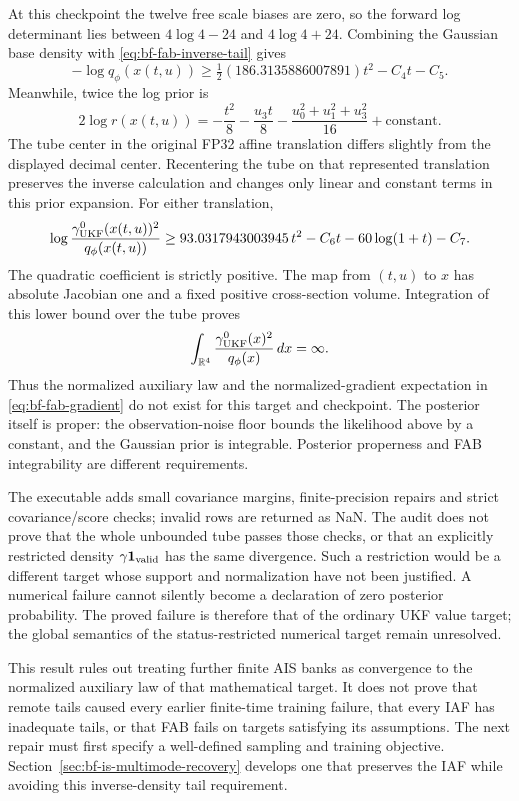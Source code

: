 At this checkpoint the twelve free scale biases are zero, so the forward
log determinant lies between $4\log4-24$ and $4\log4+24$. Combining the
Gaussian base density with \eqref{eq:bf-fab-inverse-tail} gives
\begin{equation}
 -\log q_\phi(x(t,u))\ge
 \tfrac12(186.3135886007891)t^2-C_4t-C_5.
\end{equation}
Meanwhile, twice the log prior is
\begin{equation}
 2\log r(x(t,u))=-\frac{t^2}{8}-\frac{u_3t}{8}
 -\frac{u_0^2+u_1^2+u_3^2}{16}+\text{constant}.
\end{equation}
The tube center in the original FP32 affine translation differs slightly
from the displayed decimal center. Recentering the tube on that represented
translation preserves the inverse calculation and changes only linear and
constant terms in this prior expansion. For either translation,
\begin{equation}
 \log\frac{\gamma^0_{\rm UKF}(x(t,u))^2}{q_\phi(x(t,u))}
 \ge 93.0317943003945\,t^2-C_6t-60\log(1+t)-C_7.
 \label{eq:bf-fab-tail-divergence}
\end{equation}
The quadratic coefficient is strictly positive. The map from $(t,u)$ to $x$
has absolute Jacobian one and a fixed positive cross-section volume.
Integration of this lower bound over the tube proves
\begin{equation}
 \int_{\mathbb{R}^4}\frac{\gamma^0_{\rm UKF}(x)^2}{q_\phi(x)}\,dx=\infty.
 \label{eq:bf-fab-q20-infinite}
\end{equation}
Thus the normalized auxiliary law and the normalized-gradient expectation
in \eqref{eq:bf-fab-gradient} do not exist for this target and checkpoint.
The posterior itself is proper: the observation-noise floor bounds the
likelihood above by a constant, and the Gaussian prior is integrable.
Posterior properness and FAB integrability are different requirements.

The executable adds small covariance margins, finite-precision repairs and
strict covariance/score checks; invalid rows are returned as NaN. The audit
does not prove that the whole unbounded tube passes those checks, or that an
explicitly restricted density $\gamma\mathbf1_{\rm valid}$ has the same
divergence. Such a restriction would be a different target whose support and
normalization have not been justified. A numerical failure cannot silently
become a declaration of zero posterior probability. The proved failure is
therefore that of the ordinary UKF value target; the global semantics of the
status-restricted numerical target remain unresolved.

This result rules out treating further finite AIS banks as convergence to the
normalized auxiliary law of that mathematical target. It does not prove that
remote tails caused every earlier finite-time training failure, that every
IAF has inadequate tails, or that FAB fails on targets satisfying its
assumptions. The next repair must first specify a well-defined sampling and
training objective. Section~\ref{sec:bf-is-multimode-recovery} develops one
that preserves the IAF while avoiding this inverse-density tail requirement.
